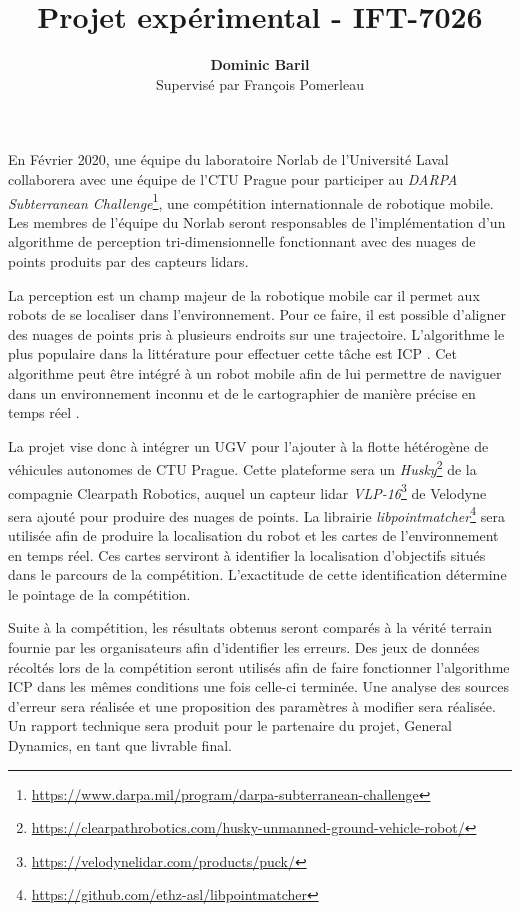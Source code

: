 \documentclass[12pt]{article}
\title{\vspace{-2.0cm} Projet expérimental - IFT-7026}
\author{\textbf{Dominic Baril} \\ \small Supervisé par François Pomerleau}
\date{\vspace{-5ex}}
\begin{document}
    \maketitle
    
     En Février 2020, une équipe du laboratoire Norlab de l'Université Laval collaborera avec une équipe de l'\ac{CTU Prague} pour participer au \textit{DARPA Subterranean Challenge}\footnote{\url{https://www.darpa.mil/program/darpa-subterranean-challenge}}, une compétition internationnale de robotique mobile. 
     Les membres de l'équipe du Norlab seront responsables de l'implémentation d'un algorithme de perception tri-dimensionnelle fonctionnant avec des nuages de points produits par des capteurs lidars.
     
     \bigskip
     
     La perception est un champ majeur de la robotique mobile car il permet aux robots de se localiser dans l'environnement.
     Pour ce faire, il est possible d'aligner des nuages de points pris à plusieurs endroits sur une trajectoire. 
     L'algorithme le plus populaire dans la littérature pour effectuer cette tâche est \ac{ICP} \cite{Chen1991}. 
     Cet algorithme peut être intégré à un robot mobile afin de lui permettre de naviguer dans un environnement inconnu et de le cartographier de manière précise en temps réel \cite{Pomerleau2013, Pomerleau2015}. %
     
     \bigskip
     
     La projet vise donc à intégrer un \ac{UGV} pour l'ajouter à la flotte hétérogène de véhicules autonomes de \ac{CTU Prague}. 
     Cette plateforme sera un \textit{Husky}\footnote{\url{https://clearpathrobotics.com/husky-unmanned-ground-vehicle-robot/}} de la compagnie Clearpath Robotics, auquel un capteur lidar \textit{VLP-16}\footnote{\url{https://velodynelidar.com/products/puck/}} de Velodyne sera ajouté pour produire des nuages de points. 
     La librairie \textit{libpointmatcher}\footnote{\url{https://github.com/ethz-asl/libpointmatcher}} sera utilisée afin de produire la localisation du robot et les cartes de l'environnement en temps réel. 
     Ces cartes serviront à identifier la localisation d'objectifs situés dans le parcours de la compétition. 
     L'exactitude de cette identification détermine le pointage de la compétition.
     
     \bigskip
     
     Suite à la compétition, les résultats obtenus seront comparés à la vérité terrain fournie par les organisateurs afin d'identifier les erreurs. 
     Des jeux de données récoltés lors de la compétition seront utilisés afin de faire fonctionner l'algorithme \ac{ICP} dans les mêmes conditions une fois celle-ci terminée.
     Une analyse des sources d'erreur sera réalisée et une proposition des paramètres à modifier sera réalisée. 
     Un rapport technique sera produit pour le partenaire du projet, General Dynamics, en tant que livrable final.
     
     \newpage
     \printbibliography[title=Références]
    
\end{document}
